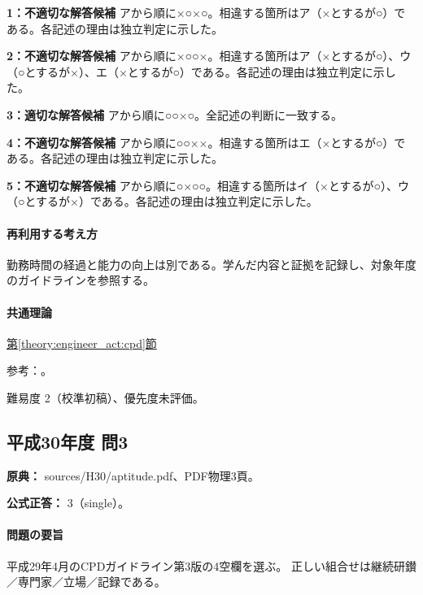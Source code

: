 \noindent\textbf{1：不適切な解答候補} アから順に×○×○。相違する箇所はア（×とするが○）である。各記述の理由は独立判定に示した。\par

\noindent\textbf{2：不適切な解答候補} アから順に×○○×。相違する箇所はア（×とするが○）、ウ（○とするが×）、エ（×とするが○）である。各記述の理由は独立判定に示した。\par

\noindent\textbf{3：適切な解答候補} アから順に○○×○。全記述の判断に一致する。\par

\noindent\textbf{4：不適切な解答候補} アから順に○○××。相違する箇所はエ（×とするが○）である。各記述の理由は独立判定に示した。\par

\noindent\textbf{5：不適切な解答候補} アから順に○×○○。相違する箇所はイ（×とするが○）、ウ（○とするが×）である。各記述の理由は独立判定に示した。\par

\paragraph{再利用する考え方} 勤務時間の経過と能力の向上は別である。学んだ内容と証拠を記録し、対象年度のガイドラインを参照する。

\paragraph{共通理論} \hyperref[theory:engineer_act:cpd]{第\ref*{theory:engineer_act:cpd}節}

\par 参考：\cite{cpd_v2}。

\par 難易度 2（校準初稿）、優先度未評価。

\subsection{平成30年度 問3}
\label{q:h30-reg-apt-03}

\noindent\textbf{原典：} sources/H30/aptitude.pdf、PDF物理3頁。

\textbf{公式正答：} 3（single）。

\paragraph{問題の要旨} 平成29年4月のCPDガイドライン第3版の4空欄を選ぶ。 正しい組合せは継続研鑚／専門家／立場／記録である。

